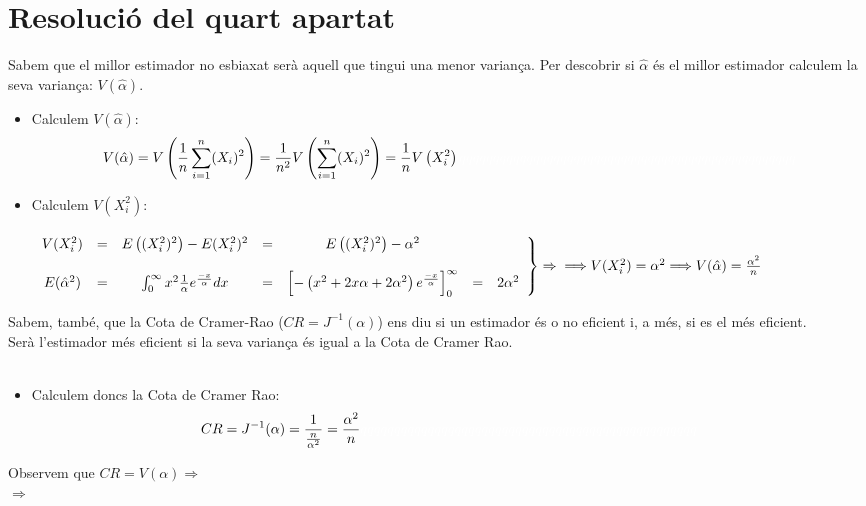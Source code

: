 \documentclass[12pt]{article}
\begin{document}
\section{Resolució del quart apartat }
Sabem que el millor estimador no esbiaxat serà aquell que tingui una menor variança. Per descobrir si $\hat{\alpha}$ és el millor estimador calculem la seva variança: $V(\hat{\alpha})$.
\begin{itemize}
    \item Calculem $V(\hat{\alpha})$:
    \begin{multline*}
        V(\hat{\alpha})=V\left(\frac{1}{n}\sum_{i=1}^{n}(X_i)^2\right) = \frac{1}{n^2}V\left(\sum_{i=1}^{n}(X_i)^2\right) = \frac{1}{n}V\left(X_i^2\right)  \textcolor{white}{qqqqqqqqqqqqqqqqqqqqqqqqqqqqqqqqqqqqqqqqqqqqqqqqqq}
    \end{multline*}
    \item Calculem $V(X_i^2)$:\\\\
    $\left.
\begin{array}{ccccccc}
    V(X_i^2) & = & E\left((X_i^2)^2\right) -E(X_i^2)^2 & = & E\left((X_i^2)^2\right) - \alpha^2 \\
                  \\
    E(\hat{\alpha}^2) & = & \int_0^{\infty} x^2 \frac{1}{\alpha}e^{\frac{-x}{\alpha}} dx & = &  \left[ -\left( x^2+2x\alpha +2\alpha^2 \right)e^{\frac{-x}{\alpha}} \right]_0^{\infty} & = & 2\alpha^2
\end{array}\right\}\Rightarrow \\\\
\Longrightarrow V(X_i^2)=\alpha^2 \Longrightarrow V(\hat{\alpha})=\frac{\alpha^2}{n}
$\end{itemize}
\vspace{2em}Sabem, també, que la Cota de Cramer-Rao \big($CR=J^{-1}(\alpha)$\big) ens diu si un estimador és o no eficient i, a  més, si es el més eficient.\\
Serà l'estimador més eficient si la seva variança és igual a la Cota de Cramer Rao. \\\\
\begin{itemize}
\item Calculem doncs la Cota de Cramer Rao:
\begin{multline*}
    CR=J^{-1}(\alpha)= \frac{1}{\frac{n}{\alpha^2}} = \frac{\alpha^2}{n} \textcolor{white}{qqqqqqqqqqqqqqqqqqqqqqqqqqqqqqqqqqqqqqqqqqqqqqqqqq}
\end{multline*}
\end{itemize}
Observem que $CR=V(\alpha)\Longrightarrow$\\
$\Longrightarrow$
\end{document}
